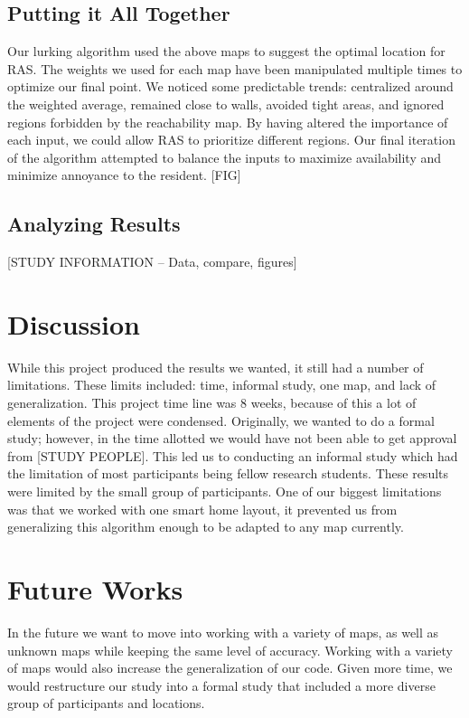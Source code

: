 \documentclass[11pt, draft, a4paper]{IEEEtran}
\begin{document}
\subsection{Putting it All Together}
Our lurking algorithm used the above maps to suggest the optimal location for 
RAS. The weights we used for each map have been manipulated multiple times to 
optimize our final point. We noticed some predictable trends: centralized 
around the weighted average, remained close to walls, avoided tight areas, and 
ignored regions forbidden by the reachability map. By having altered the 
importance of each input, we could allow RAS to prioritize different regions. 
Our final iteration of the algorithm attempted to balance the inputs to 
maximize availability and minimize annoyance to the resident. [FIG]


\subsection{Analyzing Results}
[STUDY INFORMATION -- Data, compare, figures]


\section{Discussion}
While this project produced the results we wanted, it still had a number of 
limitations. These limits included: time, informal study, one map, and lack of 
generalization. This project time line was 8 weeks, because of this a lot of 
elements of the project were condensed. Originally, we wanted to do a formal 
study; however, in the time allotted we would have not been able to get 
approval from [STUDY PEOPLE]. This led us to conducting an informal study 
which had the limitation of most participants being fellow research students. 
These results were limited by the small group of participants. One of our 
biggest limitations was that we worked with one smart home layout, it 
prevented us from generalizing this algorithm enough to be adapted to any map 
currently. 


\section{Future Works}
In the future we want to move into working with a variety of maps, as well as 
unknown maps while keeping the same level of accuracy. Working with a variety 
of maps would also increase the generalization of our code. Given more time, 
we would restructure our study into a formal study that included a more 
diverse group of participants and locations. 
\end{document}
